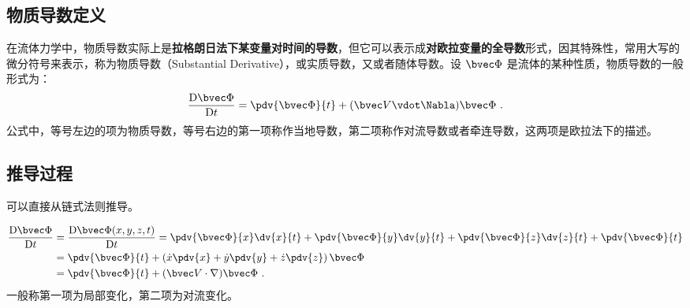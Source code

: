 
\begin{issues}
\issueDraft
\end{issues}

\subsection{物质导数定义}

在流体力学中，物质导数实际上是\textbf{拉格朗日法下某变量对时间的导数}，但它可以表示成\textbf{对欧拉变量的全导数}形式，因其特殊性，常用大写的微分符号来表示，称为物质导数（Substantial  Derivative），或实质导数，又或者随体导数。设 $\bvec \Phi$ 是流体的某种性质，物质导数的一般形式为：
\begin{equation}
\frac{\mathrm{D}\bvec \Phi }{\mathrm{D} t}=\pdv{\bvec \Phi}{t}+(\bvec V \vdot \Nabla)\bvec \Phi~.
\end{equation}
公式中，等号左边的项为物质导数，等号右边的第一项称作当地导数，第二项称作对流导数或者牵连导数，这两项是欧拉法下的描述。

\subsection{推导过程}
可以直接从链式法则推导。

\begin{equation}
\begin{aligned}
\frac{\mathrm{D} \bvec \Phi}{\mathrm{D}t} &= \frac{\mathrm{D} \bvec \Phi(x,y,z,t)}{\mathrm{D}t} = \pdv{\bvec \Phi}{x} \dv{x}{t} + \pdv{\bvec \Phi}{y} \dv{y}{t} + \pdv{\bvec \Phi}{z} \dv{z}{t} + \pdv{\bvec \Phi}{t} \\
&= \pdv{\bvec \Phi}{t} + \left(\dot x \pdv{x} + \dot y \pdv{y} + \dot z \pdv{z}\right) \bvec \Phi\\
&= \pdv{\bvec \Phi}{t} + ({\bvec V \cdot \nabla})\bvec \Phi~.
\end{aligned}
\end{equation}
一般称第一项为局部变化，第二项为对流变化。